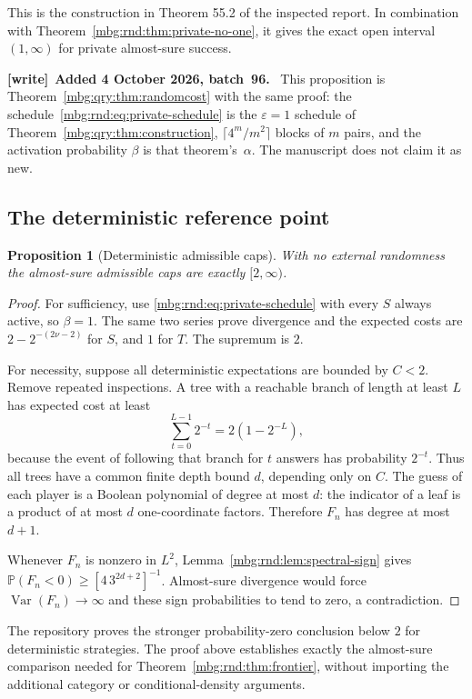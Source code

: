 \documentclass[11pt,letterpaper]{article}
\newtheorem{proposition}[theorem]{Proposition}
\theoremstyle{definition}
\newcommand{\Prb}{\mathbb P}
\DeclareMathOperator{\Var}{Var}
\newenvironment{writenote}[1][]{\par\smallskip\begingroup\small
 \noindent\textbf{[write]}\if\relax\detokenize{#1}\relax\else~\textbf{#1.}\fi\ }%
 {\par\endgroup\smallskip}
\begin{document}
This is the construction in Theorem 55.2 of the inspected report. In
combination with Theorem~\ref{mbg:rnd:thm:private-no-one}, it gives the exact open
interval $(1,\infty)$ for private almost-sure success.

\begin{writenote}[Added 4 October 2026, batch~96]
This proposition is Theorem~\ref{mbg:qry:thm:randomcost} with the same proof: the schedule~\eqref{mbg:rnd:eq:private-schedule} is the $\varepsilon=1$ schedule of Theorem~\ref{mbg:qry:thm:construction}, $\lceil4^m/m^2\rceil$ blocks of $m$ pairs, and the activation probability $\beta$ is that theorem's~$\alpha$. The manuscript does not claim it as new.
\end{writenote}

\subsection{The deterministic reference point}

\begin{proposition}[Deterministic admissible caps]
\label{mbg:rnd:prop:deterministic}
With no external randomness the almost-sure admissible caps are exactly
$[2,\infty)$.
\end{proposition}
\begin{proof}
For sufficiency, use \eqref{mbg:rnd:eq:private-schedule} with every $S$ always
active, so $\beta=1$. The same two series prove divergence and the
expected costs are $2-2^{-(2\nu-2)}$ for $S$, and $1$ for $T$.
The supremum is $2$.

For necessity, suppose all deterministic expectations are bounded by
$C<2$. Remove repeated inspections. A tree with a reachable branch of
length at least $L$ has expected cost at least
\[
 \sum_{t=0}^{L-1}2^{-t}=2(1-2^{-L}),
\]
because the event of following that branch for $t$ answers has
probability $2^{-t}$. Thus all trees have a common finite depth bound
$d$, depending only on $C$. The guess of each player is a Boolean
polynomial of degree at most $d$: the indicator of a leaf is a product
of at most $d$ one-coordinate factors. Therefore $F_n$ has degree at
most $d+1$.

Whenever $F_n$ is nonzero in $L^2$, Lemma~\ref{mbg:rnd:lem:spectral-sign} gives
$\Prb(F_n<0)\ge[4\,3^{2d+2}]^{-1}$. Almost-sure divergence would force
$\Var(F_n)\to\infty$ and these sign probabilities to tend to zero,
a contradiction.
\end{proof}

The repository proves the stronger probability-zero conclusion below
$2$ for deterministic strategies. The proof above establishes exactly
the almost-sure comparison needed for Theorem~\ref{mbg:rnd:thm:frontier}, without
importing the additional category or conditional-density arguments.
\end{document}
